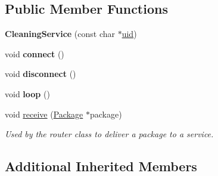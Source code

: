 \subsection*{Public Member Functions}
\begin{DoxyCompactItemize}
\item 
{\bfseries Cleaning\+Service} (const char $\ast$\hyperlink{class_bottle_buddy_1_1_embedded_1_1_pipeline_1_1_service_af290f9aa0a6dca36e802e615fab19f78}{uid})\hypertarget{class_bottle_buddy_1_1_embedded_1_1_pipeline_1_1_services_1_1_cleaning_service_ad871d221313237f485759ca603d3c534}{}\label{class_bottle_buddy_1_1_embedded_1_1_pipeline_1_1_services_1_1_cleaning_service_ad871d221313237f485759ca603d3c534}

\item 
void {\bfseries connect} ()\hypertarget{class_bottle_buddy_1_1_embedded_1_1_pipeline_1_1_services_1_1_cleaning_service_aa4175f4257e7d395ec2d2d0e0debc65f}{}\label{class_bottle_buddy_1_1_embedded_1_1_pipeline_1_1_services_1_1_cleaning_service_aa4175f4257e7d395ec2d2d0e0debc65f}

\item 
void {\bfseries disconnect} ()\hypertarget{class_bottle_buddy_1_1_embedded_1_1_pipeline_1_1_services_1_1_cleaning_service_a5ff13f92482dda1683a029f70fc84735}{}\label{class_bottle_buddy_1_1_embedded_1_1_pipeline_1_1_services_1_1_cleaning_service_a5ff13f92482dda1683a029f70fc84735}

\item 
void {\bfseries loop} ()\hypertarget{class_bottle_buddy_1_1_embedded_1_1_pipeline_1_1_services_1_1_cleaning_service_a86e7fd7dfa11b12b7d10463a232f105e}{}\label{class_bottle_buddy_1_1_embedded_1_1_pipeline_1_1_services_1_1_cleaning_service_a86e7fd7dfa11b12b7d10463a232f105e}

\item 
void \hyperlink{class_bottle_buddy_1_1_embedded_1_1_pipeline_1_1_services_1_1_cleaning_service_a6d3dee7ca6387c00cec3478821b1ea23}{receive} (\hyperlink{class_bottle_buddy_1_1_embedded_1_1_pipeline_1_1_package}{Package} $\ast$package)
\begin{DoxyCompactList}\small\item\em Used by the router class to deliver a package to a service. \end{DoxyCompactList}\end{DoxyCompactItemize}
\subsection*{Additional Inherited Members}


